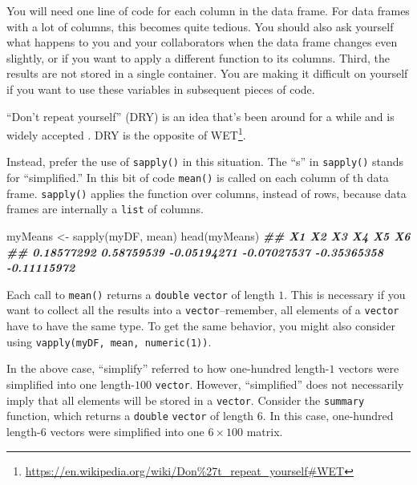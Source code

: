 \documentclass[
  12pt,
  krantz2]{krantz}
\makeatletter
\newenvironment{Shaded}{\begin{snugshade}}{\end{snugshade}}
\newcommand{\DocumentationTok}[1]{\textcolor[rgb]{0.37,0.37,0.37}{\textbf{\textit{#1}}}}
\newcommand{\FunctionTok}[1]{\textcolor[rgb]{0,0,0}{#1}}
\newcommand{\NormalTok}[1]{#1}
\newcommand{\OtherTok}[1]{\textcolor[rgb]{0.37,0.37,0.37}{#1}}
\renewcommand{\href}[2]{#2\footnote{\url{#1}}}
\newenvironment{kframe}{%
\medskip{}
\setlength{\fboxsep}{.8em}
 \def\at@end@of@kframe{}%
 \ifinner\ifhmode%
  \def\at@end@of@kframe{\end{minipage}}%
  \begin{minipage}{\columnwidth}%
 \fi\fi%
 \def\FrameCommand##1{\hskip\@totalleftmargin \hskip-\fboxsep
 \colorbox{shadecolor}{##1}\hskip-\fboxsep
     \hskip-\linewidth \hskip-\@totalleftmargin \hskip\columnwidth}%
 \MakeFramed {\advance\hsize-\width
   \@totalleftmargin\z@ \linewidth\hsize
   \@setminipage}}%
 {\par\unskip\endMakeFramed%
 \at@end@of@kframe}
\renewenvironment{Shaded}{\begin{kframe}}{\end{kframe}}
\makeatother
\begin{document}
You will need one line of code for each column in the data frame. For data frames with a lot of columns, this becomes quite tedious. You should also ask yourself what happens to you and your collaborators when the data frame changes even slightly, or if you want to apply a different function to its columns. Third, the results are not stored in a single container. You are making it difficult on yourself if you want to use these variables in subsequent pieces of code.

``Don't repeat yourself'' (DRY) is an idea that's been around for a while and is widely accepted \citep{hunt2000pragmatic}. DRY is the opposite of \href{https://en.wikipedia.org/wiki/Don\%27t_repeat_yourself\#WET}{WET}.

Instead, prefer the use of \texttt{sapply()} in this situation. The ``s'' in \texttt{sapply()} stands for ``simplified.'' In this bit of code \texttt{mean()} is called on each column of th data frame. \texttt{sapply()} applies the function over columns, instead of rows, because data frames are internally a \texttt{list} of columns.

\begin{Shaded}
\begin{Highlighting}[]
\NormalTok{myMeans }\OtherTok{\textless{}{-}} \FunctionTok{sapply}\NormalTok{(myDF, mean)}
\FunctionTok{head}\NormalTok{(myMeans)}
\DocumentationTok{\#\#          X1          X2          X3          X4          X5          X6 }
\DocumentationTok{\#\#  0.18577292  0.58759539 {-}0.05194271 {-}0.07027537 {-}0.35365358 {-}0.11115972}
\end{Highlighting}
\end{Shaded}

Each call to \texttt{mean()} returns a \texttt{double} \texttt{vector} of length \(1\). This is necessary if you want to collect all the results into a \texttt{vector}--remember, all elements of a \texttt{vector} have to have the same type. To get the same behavior, you might also consider using \texttt{vapply(myDF,\ mean,\ numeric(1))}.

In the above case, ``simplify'' referred to how one-hundred length-\(1\) vectors were simplified into one length-\(100\) \texttt{vector}. However, ``simplified'' does not necessarily imply that all elements will be stored in a \texttt{vector}. Consider the \texttt{summary} function, which returns a \texttt{double} \texttt{vector} of length \(6\). In this case, one-hundred length-\(6\) vectors were simplified into one \(6 \times 100\) matrix.
\end{document}
